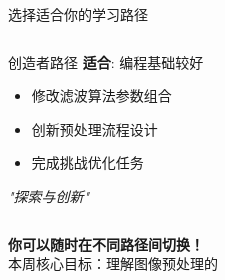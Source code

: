 \begin{frame}{选择适合你的学习路径}
\begin{columns}[t]
        \begin{block}{创造者路径}
            \textbf{适合}: 编程基础较好
            \vspace{0.2cm}
            \begin{itemize}
                \small
                \item 修改滤波算法参数组合
                \item 创新预处理流程设计
                \item 完成挑战优化任务
            \end{itemize}
            \vspace{0.2cm}
            \centering
            \textit{"探索与创新"}
        \end{block}
    \end{columns}

    \vspace{0.4cm}
    \begin{center}
        \textbf{你可以随时在不同路径间切换！}\\
        \small 本周核心目标：理解图像预处理的
    \end{center}
\end{frame}

